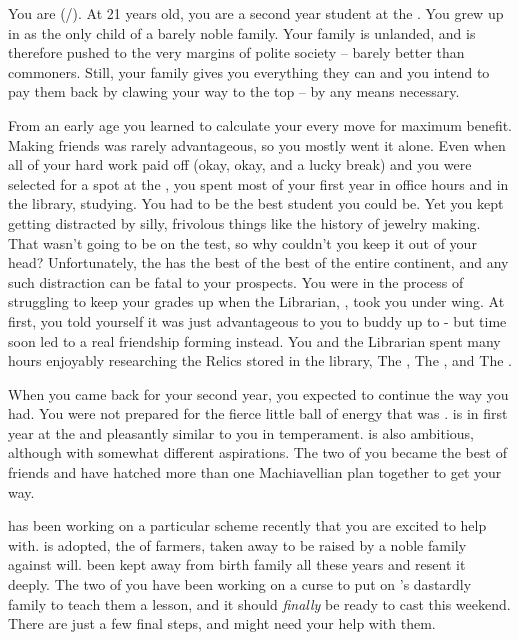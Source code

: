 \documentclass[char]{GL2020}
\begin{document}
\name{\cLibAssist{}}

You are \cLibAssist{\full;} (\cLibAssist{\they}/\cLibAssist{\them}). At 21 years old, you are a second year student at the \pSchool{}. You grew up in \pFarm{} as the only child of a barely noble family. Your family is unlanded, and is therefore pushed to the very margins of polite society -- barely better than commoners. Still, your family gives you everything they can and you intend to pay them back by clawing your way to the top -- by any means necessary.

From an early age you learned to calculate your every move for maximum benefit. Making friends was rarely advantageous, so you mostly went it alone. Even when all of your hard work paid off (okay, okay, and a lucky break) and you were selected for a spot at the \pSchool{}, you spent most of your first year in office hours and in the library, studying. You had to be the best student you could be. Yet you kept getting distracted by silly, frivolous things like the history of jewelry making. That wasn't going to be on the test, so why couldn't you keep it out of your head? Unfortunately, the \pSc{} has the best of the best of the entire continent, and any such distraction can be fatal to your prospects. You were in the process of struggling to keep your grades up when the Librarian, \cLibrarian{\full}, took you under \cLibrarian{\their} wing. At first, you told yourself it was just advantageous to you to buddy up to \cLibrarian{\them} - but time soon led to a real friendship forming instead. You and the Librarian spent many hours enjoyably researching the Relics stored in the library, The \iLariat{}, The \iNet{}, and The \iScythe{}.

When you came back for your second year, you expected to continue the way you had. You were not prepared for the fierce little ball of energy that was \cAdopted{\full}. \cAdopted{} is in \cAdopted{\their} first year at the \pSc{} and \cAdopted{\theyare} pleasantly similar to you in temperament. \cAdopted{} is also ambitious, although with somewhat different aspirations. The two of you became the best of friends and have hatched more than one Machiavellian plan together to get your way.

\cAdopted{} has been working on a particular scheme recently that you are excited to help with. \cAdopted{} is adopted, the \cAdopted{\child} of farmers, taken away to be raised by a noble family against \cAdopted{\their} will. \cAdopted{\They} \cAdopted{\have} been kept away from \cAdopted{\their} birth family all these years and \cAdopted{\they} resent\cAdopted{\plural} it deeply. The two of you have been working on a curse to put on \cAdopted{}'s dastardly family to teach them a lesson, and it should \emph{finally} be ready to cast this weekend. There are just a few final steps, and \cAdopted{} might need your help with them.
\end{document}

